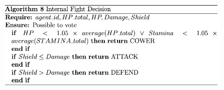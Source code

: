 

\begin{figure}[htb]
    \centering
    \includegraphics[scale=0.7]{006_team_3_agent_design/FIGS/Algo8.png}
    \label{fig:algo8}
\end{figure}


